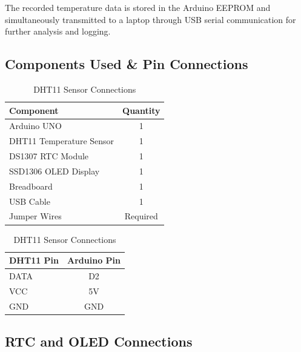 The recorded temperature data is stored in the Arduino EEPROM and simultaneously transmitted to a laptop through USB serial communication for further analysis and logging.


\subsection{Components Used \& Pin Connections}

\begin{table}[H]
\centering

\begin{minipage}[t]{0.48\textwidth}
\centering
\caption{Temperature Data Logger Components}
\label{tab:logger_components}

\begin{tabular}{|p{4cm}|c|}
\hline
\textbf{Component} & \textbf{Quantity} \\
\hline
Arduino UNO & 1 \\
DHT11 Temperature Sensor & 1 \\
DS1307 RTC Module & 1 \\
SSD1306 OLED Display & 1 \\
Breadboard & 1 \\
USB Cable & 1 \\
Jumper Wires & Required \\
\hline
\end{tabular}

\end{minipage}
\hfill
\begin{minipage}[t]{0.47\textwidth}
\centering
\caption{DHT11 Sensor Connections}
\label{tab:dht_connections}

\begin{tabular}{|l|c|}
\hline
\textbf{DHT11 Pin} & \textbf{Arduino Pin} \\
\hline
DATA & D2 \\
VCC & 5V \\
GND & GND \\
\hline
\end{tabular}

\end{minipage}

\end{table}


\subsection{RTC and OLED Connections}

